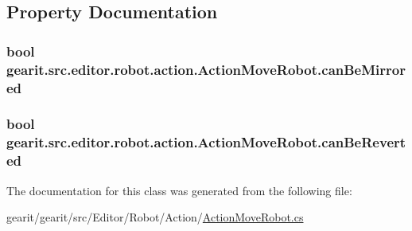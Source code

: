 \subsection{Property Documentation}
\hypertarget{classgearit_1_1src_1_1editor_1_1robot_1_1action_1_1_action_move_robot_acc667c8c7208f23a4acfe2ff62fd2e96}{
\subsubsection[{can\+Be\+Mirrored}]{\setlength{\rightskip}{0pt plus 5cm}bool gearit.\+src.\+editor.\+robot.\+action.\+Action\+Move\+Robot.\+can\+Be\+Mirrored\hspace{0.3cm}{\ttfamily [get]}}}\label{classgearit_1_1src_1_1editor_1_1robot_1_1action_1_1_action_move_robot_acc667c8c7208f23a4acfe2ff62fd2e96}
\hypertarget{classgearit_1_1src_1_1editor_1_1robot_1_1action_1_1_action_move_robot_a2e5390e27ae4d0fee1caab19539fe0e8}{
\subsubsection[{can\+Be\+Reverted}]{\setlength{\rightskip}{0pt plus 5cm}bool gearit.\+src.\+editor.\+robot.\+action.\+Action\+Move\+Robot.\+can\+Be\+Reverted\hspace{0.3cm}{\ttfamily [get]}}}\label{classgearit_1_1src_1_1editor_1_1robot_1_1action_1_1_action_move_robot_a2e5390e27ae4d0fee1caab19539fe0e8}


The documentation for this class was generated from the following file\+:\begin{DoxyCompactItemize}
\item 
gearit/gearit/src/\+Editor/\+Robot/\+Action/\hyperlink{_action_move_robot_8cs}{Action\+Move\+Robot.\+cs}\end{DoxyCompactItemize}
